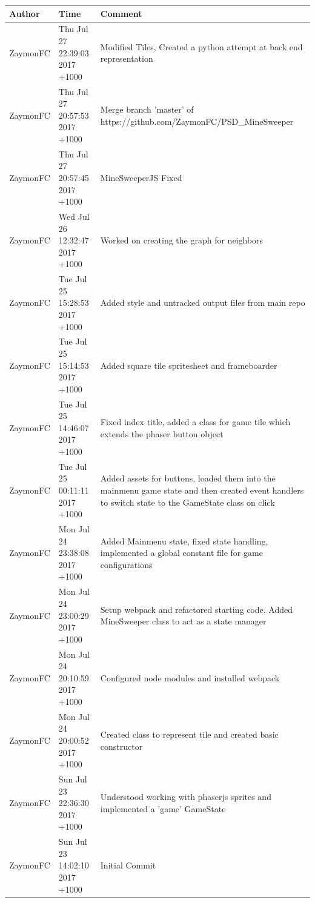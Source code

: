 \documentclass[12pt, a4]{report}
\begin{document}
	\begin{table}[!h]
		\begin{tabular}{ll p{7cm}}
			Author				  & Time   			& Comment \\ \hline
			
			ZaymonFC & Thu Jul 27 22:39:03 2017 +1000 & Modified Tiles, Created a python attempt at back end representation \\
			ZaymonFC & Thu Jul 27 20:57:53 2017 +1000 & Merge branch 'master' of https://github.com/ZaymonFC/PSD\_MineSweeper \\
			ZaymonFC & Thu Jul 27 20:57:45 2017 +1000 & MineSweeperJS Fixed \\
			ZaymonFC & Wed Jul 26 12:32:47 2017 +1000 & Worked on creating the graph for neighbors \\
			ZaymonFC & Tue Jul 25 15:28:53 2017 +1000 & Added style and untracked output files from main repo \\
			ZaymonFC & Tue Jul 25 15:14:53 2017 +1000 & Added square tile spritesheet and frameboarder \\
			ZaymonFC & Tue Jul 25 14:46:07 2017 +1000 & Fixed index title, added a class for game tile which extends the phaser button object \\
			ZaymonFC & Tue Jul 25 00:11:11 2017 +1000 & Added assets for buttons, loaded them into the mainmenu game state and then created event handlers to switch state to the GameState class on click \\
			ZaymonFC & Mon Jul 24 23:38:08 2017 +1000 & Added Mainmenu state, fixed state handling, implemented a global constant file for game configurations \\
			ZaymonFC & Mon Jul 24 23:00:29 2017 +1000 & Setup webpack and refactored starting code. Added MineSweeper class to act as a state manager \\
			ZaymonFC & Mon Jul 24 20:10:59 2017 +1000 & Configured node modules and installed webpack \\
			ZaymonFC & Mon Jul 24 20:00:52 2017 +1000 & Created class to represent tile and created basic constructor \\
			ZaymonFC & Sun Jul 23 22:36:30 2017 +1000 & Understood working with phaserjs sprites and implemented a 'game' GameState \\
			ZaymonFC & Sun Jul 23  14:02:10 2017 +1000 & Initial Commit
		\end{tabular}
	\end{table}
\end{document}
